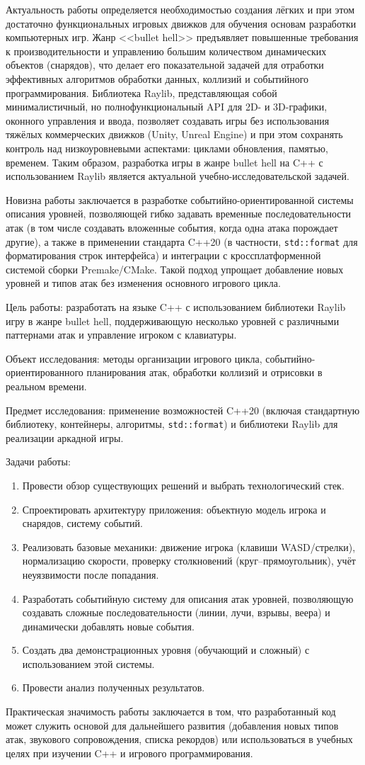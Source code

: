 \documentclass[../main.tex]{subfiles}
\begin{document}
Актуальность работы определяется необходимостью создания лёгких и при этом достаточно функциональных игровых движков для обучения основам разработки компьютерных игр. Жанр <<bullet hell>> предъявляет повышенные требования к производительности и управлению большим количеством динамических объектов (снарядов), что делает его показательной задачей для отработки эффективных алгоритмов обработки данных, коллизий и событийного программирования. Библиотека Raylib, представляющая собой минималистичный, но полнофункциональный API для 2D- и 3D-графики, оконного управления и ввода, позволяет создавать игры без использования тяжёлых коммерческих движков (Unity, Unreal Engine) и при этом сохранять контроль над низкоуровневыми аспектами: циклами обновления, памятью, временем. Таким образом, разработка игры в жанре bullet hell на C++ с использованием Raylib является актуальной учебно-исследовательской задачей.

Новизна работы заключается в разработке событийно-ориентированной системы описания уровней, позволяющей гибко задавать временные последовательности атак (в том числе создавать вложенные события, когда одна атака порождает другие), а также в применении стандарта C++20 (в частности, \texttt{std::format} для форматирования строк интерфейса) и интеграции с кроссплатформенной системой сборки Premake/CMake. Такой подход упрощает добавление новых уровней и типов атак без изменения основного игрового цикла.

Цель работы: разработать на языке C++ с использованием библиотеки Raylib игру в жанре bullet hell, поддерживающую несколько уровней с различными паттернами атак и управление игроком с клавиатуры.

Объект исследования: методы организации игрового цикла, событийно-ориентированного планирования атак, обработки коллизий и отрисовки в реальном времени.

Предмет исследования: применение возможностей C++20 (включая стандартную библиотеку, контейнеры, алгоритмы, \texttt{std::format}) и библиотеки Raylib для реализации аркадной игры.

Задачи работы:
\begin{enumerate}
    \item Провести обзор существующих решений и выбрать технологический стек.
    \item Спроектировать архитектуру приложения: объектную модель игрока и снарядов, систему событий.
    \item Реализовать базовые механики: движение игрока (клавиши WASD/стрелки), нормализацию скорости, проверку столкновений (круг–прямоугольник), учёт неуязвимости после попадания.
    \item Разработать событийную систему для описания атак уровней, позволяющую создавать сложные последовательности (линии, лучи, взрывы, веера) и динамически добавлять новые события.
    \item Создать два демонстрационных уровня (обучающий и сложный) с использованием этой системы.
    \item Провести анализ полученных результатов.
\end{enumerate}

Практическая значимость работы заключается в том, что разработанный код может служить основой для дальнейшего развития (добавления новых типов атак, звукового сопровождения, списка рекордов) или использоваться в учебных целях при изучении C++ и игрового программирования.
\end{document}

